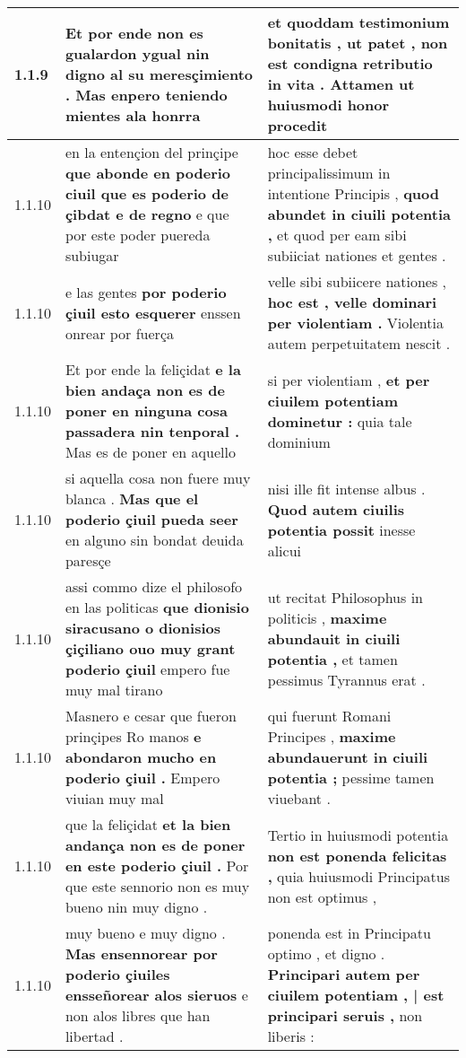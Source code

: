 \begin{tabular}{|p{1cm}|p{6.5cm}|p{6.5cm}|}
1.1.9 & Et por ende non es \textbf{ gualardon ygual nin digno al su meresçimiento . } Mas enpero teniendo mientes ala honrra & et quoddam testimonium bonitatis , \textbf{ ut patet , non est condigna retributio in vita . } Attamen ut huiusmodi honor procedit \\\hline
1.1.10 & en la entençion del prinçipe \textbf{ que abonde en poderio ciuil que es poderio de çibdat e de regno } e que por este poder puereda subiugar & hoc esse debet principalissimum in intentione Principis , \textbf{ quod abundet in ciuili potentia , } et quod per eam sibi subiiciat nationes et gentes . \\\hline
1.1.10 & e las gentes \textbf{ por poderio çiuil esto esquerer } enssen onrear por fuerça & velle sibi subiicere nationes , \textbf{ hoc est , velle dominari per violentiam . } Violentia autem perpetuitatem nescit . \\\hline
1.1.10 & Et por ende la feliçidat \textbf{ e la bien andaça non es de poner en ninguna cosa passadera nin tenporal . } Mas es de poner en aquello & si per violentiam , \textbf{ et per ciuilem potentiam dominetur : } quia tale dominium \\\hline
1.1.10 & si aquella cosa non fuere muy blanca . \textbf{ Mas que el poderio çiuil pueda seer } en alguno sin bondat deuida paresçe & nisi ille fit intense albus . \textbf{ Quod autem ciuilis potentia possit } inesse alicui \\\hline
1.1.10 & assi commo dize el philosofo en las politicas \textbf{ que dionisio siracusano o dionisios çiçiliano ouo muy grant poderio çiuil } empero fue muy mal tirano & ut recitat Philosophus in politicis , \textbf{ maxime abundauit in ciuili potentia , } et tamen pessimus Tyrannus erat . \\\hline
1.1.10 & Masnero e cesar que fueron prinçipes Ro manos \textbf{ e abondaron mucho en poderio çiuil . } Empero viuian muy mal & qui fuerunt Romani Principes , \textbf{ maxime abundauerunt in ciuili potentia ; } pessime tamen viuebant . \\\hline
1.1.10 & que la feliçidat \textbf{ et la bien andança non es de poner en este poderio çiuil . } Por que este sennorio non es muy bueno nin muy digno . & Tertio in huiusmodi potentia \textbf{ non est ponenda felicitas , } quia huiusmodi Principatus non est optimus , \\\hline
1.1.10 & muy bueno e muy digno . \textbf{ Mas ensennorear por poderio çiuiles ensseñorear alos sieruos } e non alos libres que han libertad . & ponenda est in Principatu optimo , et digno . \textbf{ Principari autem per ciuilem potentiam , | est principari seruis , } non liberis : \\\hline

\end{tabular}
